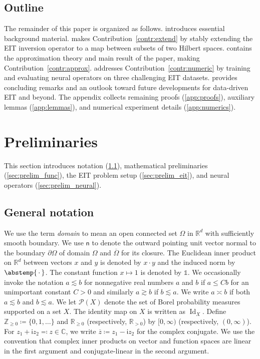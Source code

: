 \documentclass[pdflatex,sn-mathphys-num]{sn-jnl-preprint}
\newcommand{\Z}{\mathbb{Z}}
\newcommand{\R}{\mathbb{R}}
\newcommand{\C}{\mathbb{C}}
\newcommand{\sP}{\mathscr{P}}
\newcommand{\pOmega}{{\partial\Omega}}
\newcommand{\abs}{\abstemp}
\newcommand{\defeq}{\coloneqq} %
\newcommand{\eqdef}{\eqqcolon} %
\DeclareMathOperator{\Id}{Id} %
\newcommand{\onebm}{\mathds{1}} %
\newcommand{\slot}{{\,\cdot\,}}
\theoremstyle{thmstyleone}%
\theoremstyle{thmstyletwo}%
\theoremstyle{thmstylethree}%
\numberwithin{equation}{section}
\numberwithin{theorem}{section}
\begin{document}
\subsection{Outline}\label{sec:intro_outline}
The remainder of this paper is organized as follows.  introduces essential background material.  makes Contribution~\ref{contr:extend} by stably extending the EIT inversion operator to a map between subsets of two Hilbert spaces.  contains the approximation theory and main result of the paper, making Contribution~\ref{contr:approx}.  addresses Contribution~\ref{contr:numeric} by training and evaluating neural operators on three challenging EIT datasets.  provides concluding remarks and an outlook toward future developments for data-driven EIT and beyond. The appendix collects remaining proofs (\cref{app:proofs}), auxiliary lemmas (\cref{app:lemmas}), and numerical experiment details (\cref{app:numerics}).


\section{Preliminaries}\label{sec:prelim}
This section introduces notation (\cref{sec:prelim_notation}), mathematical preliminaries (\cref{sec:prelim_func}), the EIT problem setup (\cref{sec:prelim_eit}), and neural operators (\cref{sec:prelim_neural}).

\subsection{General notation}\label{sec:prelim_notation}
We use the term \emph{domain} to mean an open connected set $\Omega$ in $\R^d$ with sufficiently smooth boundary. We use $\mathsf{n}$ to denote the outward pointing unit vector normal to the boundary $\pOmega$ of domain $\Omega$ and $\overline{\Omega}$ for its closure. The Euclidean inner product on $\R^d$ between vectors $x$ and $y$ is denoted by $x\cdot y$ and the induced norm by $\abs{\slot}$. The constant function $x\mapsto 1$ is denoted by $\onebm$. We occasionally invoke the notation $a \lesssim b$ for nonnegative real numbers $a$ and $b$ if $a\leq Cb$ for an unimportant constant $C>0$ and similarly $a\gtrsim b$ if $b\lesssim a$. We write $a \asymp b$ if both $a\lesssim b$ and $b\lesssim a$. We let $\sP(X)$ denote the set of Borel probability measures supported on a set $X$. The identity map on $X$ is written as $\Id_X$. Define $\Z_{\geq 0}\defeq \{0,1,\ldots\}$ and $\R_{\geq 0}$ (respectively, $\R_{> 0}$) by $[0,\infty)$ (respectively, $(0,\infty)$). For $z_1+\mathsf{i}z_2\eqdef z\in\C$, we write $\overline{z}\defeq z_1-\mathsf{i}z_2$ for the complex conjugate. We use the convention that complex inner products on vector and function spaces are linear in the first argument and conjugate-linear in the second argument.
\end{document}
